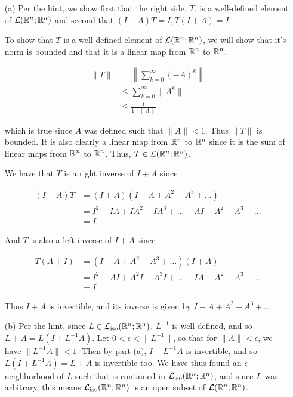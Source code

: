 \documentclass{hmwk}
\begin{document}
\begin{solution}
\begin{itemize}
    \item[(a)] Per the hint, we show first that the right side, $T$, is a well-defined element of $\mathcal{L}(\mathbb{R}^n; \mathbb{R}^n)$ and second that $(I + A)T = I, T(I+A) = I$.

    \pre To show that $T$ is a well-defined element of $\mathcal{L}(\mathbb{R}^n; \mathbb{R}^n)$, we will show that it's norm is bounded and that it is a linear map from $\mathbb{R}^n$ to $\mathbb{R}^n$. 

    \begin{align*}
        \|T\| &= \left\|\sum_{k = 0}^\infty (-A)^k\right\| \\
        &\leq \sum_{k = 0}^\infty \|A^k\| \\
        &\leq \frac{1}{1 - \|A\|}
    \end{align*}

    \pre which is true since $A$ was defined such that $\|A\| < 1$. Thus $\|T\|$ is bounded. It is also clearly a linear map from $\mathbb{R}^n$ to $\mathbb{R}^n$ since it is the sum of linear maps from $\mathbb{R}^n$ to $\mathbb{R}^n$. Thus, $T \in \mathcal{L}(\mathbb{R}^n; \mathbb{R}^n)$.

    \pre We have that $T$ is a right inverse of $I + A$ since

    \pre \begin{align*}
        (I + A)T &= (I + A)(I - A + A^2 - A^3 + \dots )\\
        &= I^2 - IA + IA^2 - IA^3 + \dots + AI - A^2 + A^3 - \dots \\
        &= I
    \end{align*}

    \pre And $T$ is also a left inverse of $I + A$ since 

    \begin{align*}
        T(A + I) &= (I - A + A^2 - A^3 + \dots)(I + A) \\
        &= I^2 - AI + A^2I - A^3I + \dots + IA - A^2 + A^3 - \dots \\
        &= I
    \end{align*}

    \pre Thus $I + A$ is invertible, and its inverse is given by $I - A + A^2 - A^3 + \dots $

    \item[(b)] Per the hint, since $L \in \mathcal{L}_{\text{iso}}(\mathbb{R}^n;\mathbb{R}^n)$, $L^{-1}$ is well-defined, and so $L + A = L(I + L^{-1}A)$. Let $0 < \epsilon < \|L^{-1}\|$, so that for $\|A\| < \epsilon$, we have $\|L^{-1}A\| < 1$. Then by part (a), $I + L^{-1}A$ is invertible, and so $L(I + L^{-1}A) = L + A$ is invertible too. We have thus found an $\epsilon-$neighborhood of $L$ such that is contained in $\mathcal{L}_{\text{iso}}(\mathbb{R}^n;\mathbb{R}^n)$, and since $L$ was arbitrary, this means $\mathcal{L}_{\text{iso}}(\mathbb{R}^n;\mathbb{R}^n)$ is an open subset of $\mathcal{L}(\mathbb{R}^n;\mathbb{R}^n)$.


\end{itemize}
\end{solution}
\end{document}
